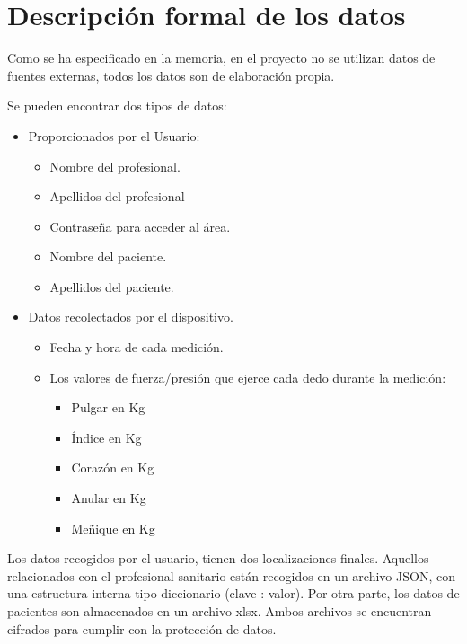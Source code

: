 \section{Descripción formal de los datos}

Como se ha especificado en la memoria, en el proyecto no se utilizan datos de fuentes externas, todos los datos son de elaboración propia.

Se pueden encontrar dos tipos de datos:
\begin{itemize}
    \item Proporcionados por el Usuario:
    \begin{itemize}
        \item Nombre del profesional. 
        \item Apellidos del profesional
        \item Contraseña para acceder al área.
        \item Nombre del paciente.
        \item Apellidos del paciente.
    \end{itemize}
        \item Datos recolectados por el dispositivo.
        \begin{itemize}
            \item Fecha y hora de cada medición.
            \item Los valores de fuerza/presión que ejerce cada dedo durante la medición:
            \begin{itemize}
                \item Pulgar en Kg
                \item Índice en Kg
                \item Corazón en Kg
                \item Anular en Kg
                \item Meñique en Kg
            \end{itemize}
        \end{itemize}
\end{itemize}

Los datos recogidos por el usuario, tienen dos localizaciones finales. Aquellos relacionados con el profesional sanitario están recogidos en un archivo JSON, con una estructura interna tipo diccionario (clave : valor). Por otra parte, los datos de pacientes son almacenados en un archivo xlsx. Ambos archivos se encuentran cifrados para cumplir con la protección de datos.

